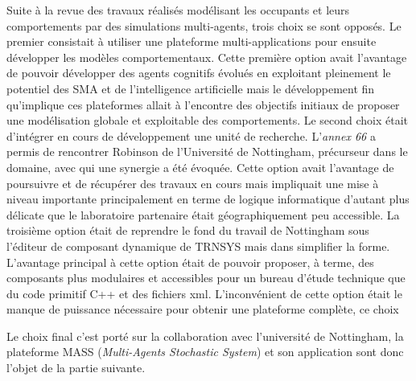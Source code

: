 Suite à la revue des travaux réalisés modélisant les occupants et leurs comportements par des simulations multi-agents, trois choix se sont opposés. Le premier consistait à utiliser une plateforme multi-applications pour ensuite développer les modèles comportementaux. Cette première option avait l'avantage de pouvoir développer des agents cognitifs évolués en exploitant pleinement le potentiel des SMA et de l'intelligence artificielle mais le développement fin qu'implique ces plateformes allait à l'encontre des objectifs initiaux de proposer une modélisation globale et exploitable des comportements. Le second choix était d'intégrer en cours de développement une unité de recherche. L'\textit{annex 66} a permis de rencontrer Robinson de l'Université de Nottingham, précurseur dans le domaine, avec qui une synergie a été évoquée. Cette option avait l'avantage de poursuivre et de récupérer des travaux en cours mais impliquait une mise à niveau importante principalement en terme de logique informatique d'autant plus délicate que le laboratoire partenaire était géographiquement peu accessible. La troisième option était de reprendre le fond du travail de Nottingham sous l'éditeur de composant dynamique de TRNSYS mais dans simplifier la forme. L'avantage principal à cette option était de pouvoir proposer, à terme, des composants plus modulaires et accessibles pour un bureau d'étude technique que du code primitif C++ et des fichiers xml. L'inconvénient de cette option était le manque de puissance nécessaire pour obtenir une plateforme complète, ce choix  

Le choix final c'est porté sur la collaboration avec l'université de Nottingham, la plateforme MASS (\textit{Multi-Agents Stochastic System}) et son application sont donc l'objet de la partie suivante.

